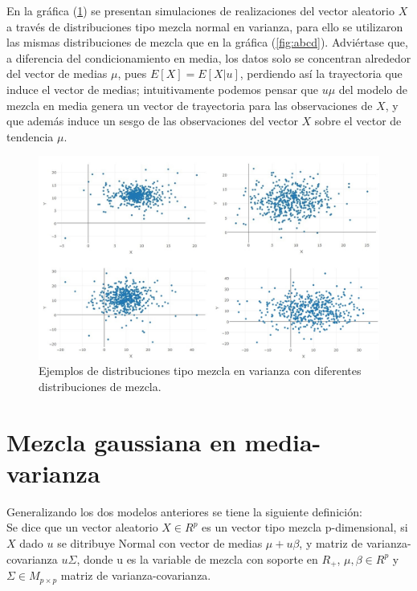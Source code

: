 En la gráfica (\ref{fig:dmv}) se presentan simulaciones de realizaciones del vector aleatorio $X$ a través de distribuciones tipo mezcla normal en varianza, para ello se utilizaron las mismas distribuciones de mezcla que en la gráfica (\ref{fig:abcd}). Adviértase que, a diferencia del condicionamiento en media, los datos solo se concentran alrededor del vector de medias $\mu$, pues $E[X]=E[X|u]$, perdiendo así la trayectoria que induce el vector de medias; intuitivamente podemos pensar que $u\mu$ del modelo de mezcla en media genera un vector de trayectoria para las observaciones de $X$, y que además induce un sesgo de las observaciones del vector $X$ sobre el vector de tendencia $\mu$.\\

\begin{figure}[h]
	\centering
	\includegraphics[width=1\linewidth]{Figuras/varianzaexp}
	\caption{Ejemplos de distribuciones tipo mezcla en varianza con diferentes distribuciones de mezcla.}
	\label{fig:dmv}
\end{figure}


\pagebreak
\section{Mezcla gaussiana en media-varianza}

Generalizando los dos modelos anteriores se tiene la siguiente definición:\\

Se dice que un vector aleatorio $X\in R^{p}$ es un vector tipo mezcla p-dimensional, si $X$ dado $u$ se ditribuye Normal con vector de medias $\mu +u\beta$, y matriz de varianza-covarianza $u\Sigma$, donde u es la variable de mezcla con soporte en $R_{+}$, $\mu, \beta \in R^{p}$ y $\Sigma\in M_{p \times p}$ matriz de varianza-covarianza.

